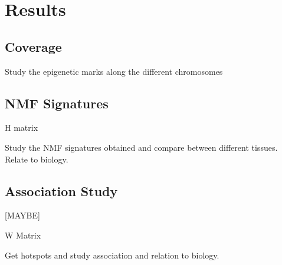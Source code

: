 
\chapter{Results}\label{Results} %


\section{Coverage}

Study the epigenetic marks along the different chromosomes


\section{NMF Signatures}

H matrix

Study the NMF signatures obtained and compare between different tissues. Relate to biology.

\section{Association Study}

[MAYBE]

W Matrix

Get hotspots and study association and relation to biology.
